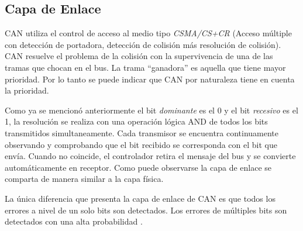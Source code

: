 \subsection{Capa de Enlace}
CAN utiliza el control de acceso al medio tipo \textit{CSMA/CS+CR} (Acceso múltiple con detección de portadora, detección de colisión más resolución de colisión). CAN resuelve el problema de la colisión con la supervivencia de una de las tramas que chocan en el bus. La trama ``ganadora'' es aquella que tiene mayor prioridad. Por lo tanto se puede indicar que CAN por naturaleza tiene en cuenta la prioridad.

Como ya se mencionó anteriormente el bit \textit{dominante} es el 0 y el bit \textit{recesivo} es el 1, la resolución se realiza con una operación lógica AND de todos los bits transmitidos simultaneamente. Cada transmisor se encuentra continuamente
observando y comprobando que el bit recibido se corresponda con el bit que envía. Cuando no coincide, el controlador retira el mensaje del bus y se convierte automáticamente en receptor. Como puede observarse la capa de enlace se comparta de manera similar a la capa física.

La única diferencia que presenta la capa de enlace de CAN es que todos los errores a nivel de un solo bits son detectados. Los errores de múltiples bits son detectados con una alta probabilidad \citep{can-ciaWEB}.
